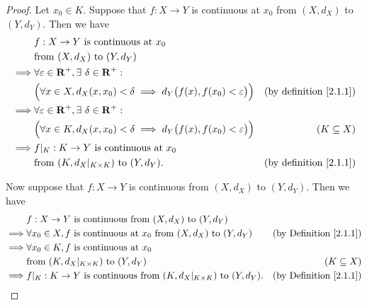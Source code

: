 \begin{proof}
    Let \(x_0 \in K\).
    Suppose that \(f : X \to Y\) is continuous at \(x_0\) from \((X, d_X)\) to \((Y, d_Y)\).
    Then we have
    \begin{align*}
                 & f : X \to Y \text{ is continuous at } x_0                                                                                             \\
                 & \text{from } (X, d_X) \text{ to } (Y, d_Y)                                                                                            \\
        \implies & \forall \varepsilon \in \mathbf{R}^+, \exists\ \delta \in \mathbf{R}^+ :                                                              \\
                 & \Big(\forall x \in X, d_X(x, x_0) < \delta \implies d_Y\big(f(x), f(x_0) < \varepsilon\big)\Big) & \text{(by definition \ref{2.1.1})} \\
        \implies & \forall \varepsilon \in \mathbf{R}^+, \exists\ \delta \in \mathbf{R}^+ :                                                              \\
                 & \Big(\forall x \in K, d_X(x, x_0) < \delta \implies d_Y\big(f(x), f(x_0) < \varepsilon\big)\Big) & (K \subseteq X)                    \\
        \implies & f|_K : K \to Y \text{ is continuous at } x_0                                                                                          \\
                 & \text{from } (K, d_X|_{K \times K}) \text{ to } (Y, d_Y).                                        & \text{(by definition \ref{2.1.1})}
    \end{align*}

    Now suppose that \(f : X \to Y\) is continuous from \((X, d_X)\) to \((Y, d_Y)\).
    Then we have
    \begin{align*}
                 & f : X \to Y \text{ is continuous from } (X, d_X) \text{ to } (Y, d_Y)                                                               \\
        \implies & \forall x_0 \in X, f \text{ is continuous at } x_0 \text{ from } (X, d_X) \text{ to } (Y, d_Y) & \text{(by Definition \ref{2.1.1})} \\
        \implies & \forall x_0 \in K, f \text{ is continuous at } x_0                                                                                  \\
                 & \text{from } (K, d_X|_{K \times K}) \text{ to } (Y, d_Y)                                       & (K \subseteq X)                    \\
        \implies & f|_K : K \to Y \text{ is continuous from } (K, d_X|_{K \times K}) \text{ to } (Y, d_Y).        & \text{(by Definition \ref{2.1.1})}
    \end{align*}
\end{proof}

